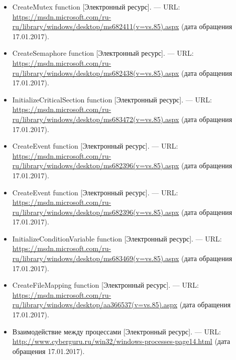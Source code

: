 \documentclass[14pt,a4paper,report]{report}
\begin{document}
\begin{itemize}
	\item CreateMutex function [Электронный ресурс]. — URL: \href{https://msdn.microsoft.com/ru-ru/library/windows/desktop/ms682411(v=vs.85).aspx}{https://msdn.microsoft.com/ru-ru/library/windows/\linebreak desktop/ms682411(v=vs.85).aspx} (дата обращения 17.01.2017).
	
	\item CreateSemaphore function [Электронный ресурс]. — URL: \href{https://msdn.microsoft.com/ru-ru/library/windows/desktop/ms682438(v=vs.85).aspx}{https://msdn.microsoft.com/ru-ru/library/windows/\linebreak desktop/ms682438(v=vs.85).aspx} (дата обращения 17.01.2017).
	
	\item InitializeCriticalSection function [Электронный ресурс]. — URL: \href{https://msdn.microsoft.com/ru-ru/library/windows/desktop/ms683472(v=vs.85).aspx}{https://msdn.microsoft.com/ru-ru/library/\linebreak windows/desktop/ms683472(v=vs.85).aspx} (дата обращения 17.01.2017).
	
	\item CreateEvent function [Электронный ресурс]. — URL: \href{https://msdn.microsoft.com/ru-ru/library/windows/desktop/ms682396(v=vs.85).aspx}{https://msdn.microsoft.com/ru-ru/library/windows/\linebreak desktop/ms682396(v=vs.85).aspx} (дата обращения 17.01.2017).
	
	\item CreateEvent function [Электронный ресурс]. — URL: \href{https://msdn.microsoft.com/ru-ru/library/windows/desktop/ms682396(v=vs.85).aspx}{https://msdn.microsoft.com/ru-ru/library/windows/\linebreak desktop/ms682396(v=vs.85).aspx} (дата обращения 17.01.2017).
	
	\item InitializeConditionVariable function [Электронный ресурс]. — URL: \href{https://msdn.microsoft.com/ru-ru/library/windows/desktop/ms683469(v=vs.85).aspx}{https://msdn.microsoft.com/ru-ru/library/\linebreak windows/desktop/ms683469(v=vs.85).aspx} (дата обращения 17.01.2017).
	
	\item CreateFileMapping function [Электронный ресурс]. — URL: \href{https://msdn.microsoft.com/ru-ru/library/windows/desktop/aa366537(v=vs.85).aspx}{https://msdn.microsoft.com/ru-ru/library/windows/\linebreak desktop/aa366537(v=vs.85).aspx} (дата обращения 17.01.2017).
	
	\item Взаимодействие между процессами [Электронный ресурс]. — URL: \href{http://www.cyberguru.ru/win32/windows-processes-page14.html}{http://www.cyberguru.ru/win32/\linebreak windows-processes-page14.html} (дата обращения 17.01.2017).
\end{itemize}
\end{document}
